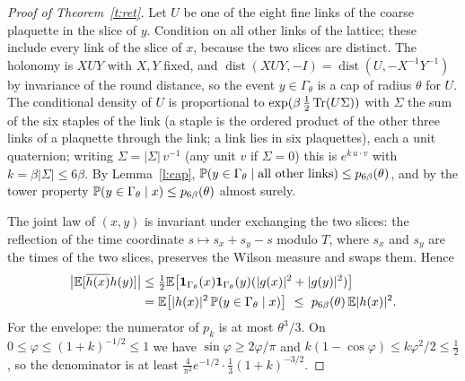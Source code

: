 \begin{proof}[Proof of Theorem~\ref{t:ret}]
Let $U$ be one of the eight fine links of the coarse plaquette in the slice of $y$. Condition on all other
links of the lattice; these include every link of the slice of $x$, because the two slices are distinct. The
holonomy is $XUY$ with $X,Y$ fixed, and $\operatorname{dist}(XUY,-I)=\operatorname{dist}(U,-X^{-1}Y^{-1})$ by
invariance of the round distance, so the event $y\in \Gamma_\theta$ is a cap of radius $\theta$ for $U$. The
conditional density of $U$ is proportional to $\exp(\beta\,\tfrac12\Tr(U\Sigma))$ with $\Sigma$ the sum of the
six staples of the link (a staple is the ordered product of the other three links of a plaquette through the
link; a link lies in six plaquettes), each a unit quaternion; writing $\Sigma=|\Sigma|\,v^{-1}$ (any unit $v$ if $\Sigma=0$) this is $e^{k\,u\cdot v}$ with
$k=\beta|\Sigma|\le6\beta$. By Lemma~\ref{l:cap}, $\P(y\in \Gamma_\theta\mid\text{all other links})\le
p_{6\beta}(\theta)$, and by the tower property $\P(y\in \Gamma_\theta\mid x)\le p_{6\beta}(\theta)$ almost surely.

The joint law of $(x,y)$ is invariant under exchanging the two slices: the reflection of the time coordinate
$s\mapsto s_x+s_y-s$ modulo $T$, where $s_x$ and $s_y$ are the times of the two slices, preserves the Wilson measure and swaps them. Hence
\begin{align*}
\big|\E[\overline{h(x)}h(y)]\big|&\le\tfrac12\E\big[\mathbf 1_{\Gamma_\theta}(x)\mathbf 1_{\Gamma_\theta}(y)(|g(x)|^2+|g(y)|^2)\big]\\
&=\E\big[|h(x)|^2\,\P(y\in \Gamma_\theta\mid x)\big]\ \le\ p_{6\beta}(\theta)\,\E|h(x)|^2 .
\end{align*}
For the envelope: the numerator of $p_k$ is at most $\theta^3/3$. On $0\le\varphi\le(1+k)^{-1/2}\le1$ we have
$\sin\varphi\ge2\varphi/\pi$ and $k(1-\cos\varphi)\le k\varphi^2/2\le\tfrac12$, so the denominator is at least
$\tfrac{4}{\pi^2}e^{-1/2}\cdot\tfrac13(1+k)^{-3/2}$.
\end{proof}

